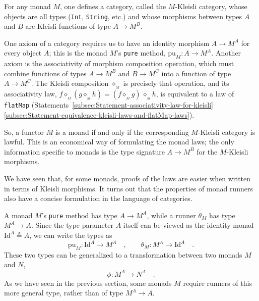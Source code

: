 For any monad $M$, one defines a category, called the $M$-Kleisli
category, whose objects are all types (\lstinline!Int!, \lstinline!String!,
etc.) and whose morphisms between types $A$ and $B$ are Kleisli
functions of type $A\rightarrow M^{B}$. 

One axiom of a category requires us to have an identity morphism $A\rightarrow M^{A}$
for every object $A$; this is the monad $M$\textsf{'}s \lstinline!pure!
method, $\text{pu}_{M}:A\rightarrow M^{A}$. Another axiom is the
associativity of morphism composition operation, which must combine
functions of types $A\rightarrow M^{B}$ and $B\rightarrow M^{C}$
into a function of type $A\rightarrow M^{C}$. The Kleisli composition
$\diamond_{_{M}}$ is precisely that operation, and its associativity
law, $f\diamond_{_{M}}(g\diamond_{_{M}}h)=(f\diamond_{_{M}}g)\,\diamond_{_{M}}h$,
is equivalent to a law of \lstinline!flatMap! (Statements~\ref{subsec:Statement-associativity-law-for-kleisli}\textendash \ref{subsec:Statement-equivalence-kleisli-laws-and-flatMap-laws}).

So, a functor $M$ is a monad if and only if the corresponding $M$-Kleisli
category is lawful. This is an economical way of formulating the monad
laws; the only information specific to monads is the type signature
$A\rightarrow M^{B}$ for the $M$-Kleisli morphisms.

We have seen that, for some monads, proofs of the laws are easier
when written in terms of Kleisli morphisms. It turns out that the
properties of monad runners also have a concise formulation in the
language of categories.

A monad $M$\textsf{'}s \lstinline!pure! method has type $A\rightarrow M^{A}$,
while a runner $\theta_{M}$ has type $M^{A}\rightarrow A$. Since
the type parameter $A$ itself can be viewed as the identity monad
$\text{Id}^{A}\triangleq A$, we can write the types as
\[
\text{pu}_{M}:\text{Id}^{A}\rightarrow M^{A}\quad,\quad\quad\theta_{M}:M^{A}\rightarrow\text{Id}^{A}\quad.
\]
 These two types can be generalized to a transformation between two
monads $M$ and $N$,
\[
\phi:M^{A}\rightarrow N^{A}\quad.
\]
As we have seen in the previous section, some monads $M$ require
runners of this more general type, rather than of type $M^{A}\rightarrow A$.

